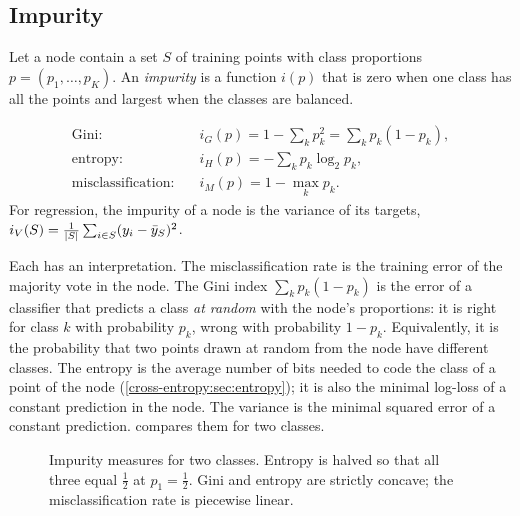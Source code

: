 \begin{notechapter}
\section{Impurity}\label{decision-trees:sec:impurity}

Let a node contain a set $S$ of training points with class proportions $p = (p_1,\dots,p_K)$. An
\emph{impurity} is a function $i(p)$ that is zero when one class has all the points and largest
when the classes are balanced.

\begin{definition}
\begin{align*}
  \text{Gini:}\quad& i_G(p) = 1 - \sum_kp_k^2 = \sum_kp_k(1 - p_k),\\
  \text{entropy:}\quad& i_H(p) = -\sum_kp_k\log_2p_k,\\
  \text{misclassification:}\quad& i_M(p) = 1 - \max_kp_k .
\end{align*}
For regression, the impurity of a node is the variance of its targets,
$i_V(S) = \frac1{\left|S\right|}\sum_{i\in S}(y_i - \bar y_S)^2$.
\end{definition}

Each has an interpretation. The misclassification rate is the training error of the
majority vote in the node. The Gini index $\sum_kp_k(1 - p_k)$ is the error of a classifier that
predicts a class \emph{at random} with the node's proportions: it is right for class $k$ with
probability $p_k$, wrong with probability $1 - p_k$. Equivalently, it is the probability that two
points drawn at random from the node have different classes. The entropy is the
average number of bits needed to code the class of a point of the node
(\cref{cross-entropy:sec:entropy}); it is also the minimal log-loss of a constant prediction in
the node. The variance is the minimal squared error of a constant prediction.
 compares them for two classes.

\begin{figure}[ht]
\centering
{}
\caption{Impurity measures for two classes. Entropy is halved so that all three equal $\frac12$
at $p_1 = \frac12$. Gini and entropy are strictly concave; the misclassification rate is
piecewise linear.}
\label{decision-trees:fig:impurity}
\end{figure}


\end{notechapter}

